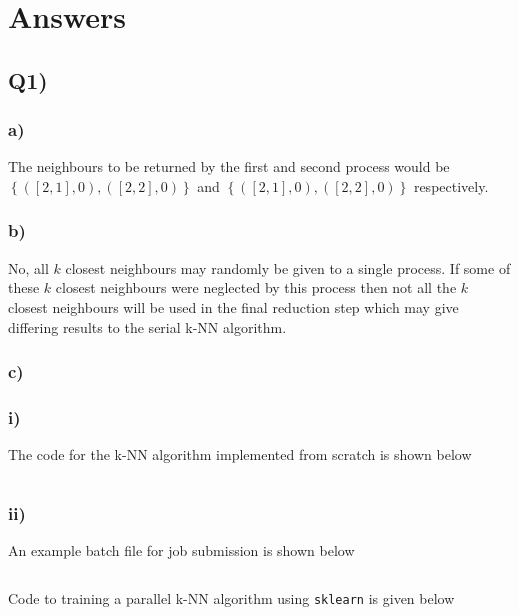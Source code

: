 \section{Answers}

\subsection*{{\bf Q1)}}
\subsubsection*{{\bf a)}}
The neighbours to be returned by the first and second process would be $\left\{ \left( \left[ 2,1 \right], 0 \right), \left( \left[ 2,2 \right], 0 \right) \right\}$ and $\left\{ \left( \left[ 2,1 \right], 0 \right), \left( \left[ 2,2 \right], 0 \right) \right\}$ respectively.

\subsubsection*{{\bf b)}}
No, all $k$ closest neighbours may randomly be given to a single process. If some of these $k$ closest neighbours  were neglected by this process then not all the $k$ closest neighbours will be used in the final reduction step which may give differing results to the serial k-NN algorithm.

\subsubsection*{{\bf c)}}
\subsubsection*{{\bf i)}}
The code for the k-NN algorithm implemented from scratch is shown below
\inputminted[mathescape,
    linenos,
    numbersep=5pt,
    frame=lines,
    framesep=2mm]{python}{src/KNN_parallel.py}

\subsubsection*{{\bf ii)}}
An example batch file for job submission is shown below
\inputminted[mathescape,
    linenos,
    numbersep=5pt,
    frame=lines,
    framesep=2mm]{bash}{src/batch/KNN_1_thread.sh}
    
Code to training a parallel k-NN algorithm using \texttt{sklearn} is given below
\inputminted[mathescape,
    linenos,
    numbersep=5pt,
    frame=lines,
    framesep=2mm]{python}{src/KNN_demo.py}
    
